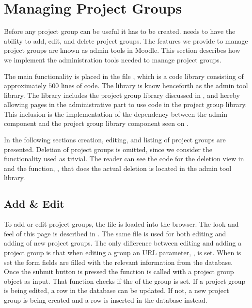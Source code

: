 \section{Managing Project Groups} %
\label{sec:manProjGrpImpl}
Before any project group can be useful it has to be created.
\admpers[c] needs to have the ability to add, edit, and delete project groups.
The features we provide to manage project groups are known as admin tools in Moodle.
This section describes how we implement the administration tools needed to manage project groups.


The main functionality is placed in the file , which is a code library consisting of approximately $500$ lines of code. 
The library is know henceforth as the admin tool library.
The library includes the project group library discussed in , and hereby allowing pages in the administrative part to use code in the project group library. 
This inclusion is the implementation of the dependency between the admin component and the project group library component seen on . 

In the following sections creation, editing, and listing of project groups are presented. 
Deletion of project groups is omitted, since we consider the functionality used as trivial. 
The reader can see the code for the deletion view in  and the function, , that does the actual deletion is located in the admin tool library.

\subsection{Add \& Edit}
\label{sub:addedditprojectgroups}
To add or edit project groups, the file  is loaded into the browser. 
The look and feel of this page is described in .
The same file is used for both editing and adding of new project groups. 
The only difference between editing and adding a project group is that when editing a group an URL parameter, , is set.
When  is set the form fields are filled with the relevant information from the database.
Once the submit button is pressed the function  is called with a project group object as input.
That function checks if the  of the group is set. 
If a project group is being edited, a row in the database can be updated.
If not, a new project group is being created and a row is inserted in the database instead.

